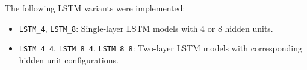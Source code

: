 The following LSTM variants were implemented:

\begin{itemize}
\item \texttt{LSTM\_4}, \texttt{LSTM\_8}: Single-layer LSTM models with 4 or 8 hidden units.
\item \texttt{LSTM\_4\_4}, \texttt{LSTM\_8\_4}, \texttt{LSTM\_8\_8}: Two-layer LSTM models with corresponding hidden unit configurations.
\end{itemize}

\begin{comment}


\begin{equation}
\alpha = \frac{\omega_1}{\omega_0 + \omega_1} %
\label{eq:alpha}
\end{equation}

where $\omega_0$ and $\omega_1$ are the class weights for the majority (no recession) and minority (recession) classes, respectively.

\begin{equation}
\omega_c = \frac{n_{samples}}{n_{classes} \cdot n_c}
\label{eq:class_weight}
\end{equation}

\noindent
where:
\vspace{-9pt}
\begin{itemize} [itemsep = -6pt]
    \item $c = $ class 0 or class 1
    \item $\omega_c = $ weight for class $c$
    \item $n_{samples} = $ total number of training samples
    \item $n_{classes} = $ number of distinct classes
    \item $n_c = $ number of samples in class $c$
\end{itemize}


\begin{equation}
L_{\text{focal}}(p_t) = -\alpha_t (1 - p_t)^\gamma \log(p_t)
\label{eq:binary_focal_loss_function}
\end{equation}

where $p_t$ is the predicted probability of the true class.

\end{comment}

